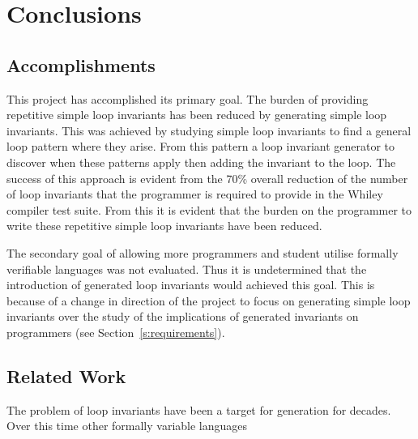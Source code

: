 \chapter{Conclusions}\label{C:con}


\section{Accomplishments}

This project has accomplished its primary goal.
The burden of providing repetitive simple loop invariants has been reduced by generating simple loop invariants.
This was achieved by studying simple loop invariants to find a general loop pattern where they arise.
From this pattern a loop invariant generator to discover when these patterns apply
then adding the invariant to the loop.
The success of this approach is evident from the 70\% overall reduction of the number of loop invariants 
that the programmer is required to provide in the Whiley compiler test suite.
From this it is evident that the burden on the programmer to write
these repetitive simple loop invariants have been reduced.

The secondary goal of allowing more programmers and student utilise formally verifiable
languages was not evaluated.
Thus it is undetermined that the introduction of generated loop invariants would achieved this goal.
This is because of a change in direction of the project to focus on generating simple loop
invariants over the study of the implications of generated invariants on programmers (see Section~\ref{s:requirements}).

\section{Related Work}

The problem of loop invariants have been a target for generation for decades.
Over this time other formally variable languages

